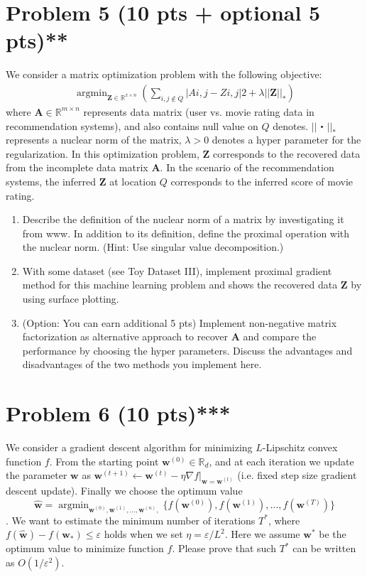 \documentclass{jsarticle}
\DeclareMathOperator*{\argmin}{argmin}
\begin{document}
\section*{Problem 5 (10 pts + optional 5 pts)**}
We consider a matrix optimization problem with the following objective:
\begin{align*}
  \argmin_{\bm Z\in\mathbb R^{x\times n}} \left( \sum_{i,j\notin Q} |Ai,j − Zi,j |2 + λ||\bm Z||_*\right)
\end{align*}
where $\bm A \in \mathbb R^{m\times n}$ represents data matrix (user vs. movie rating data in recommendation systems), and also contains null value on $Q$ denotes. $||・||_*$ represents a nuclear norm of the matrix, $\lambda > 0$ denotes a hyper parameter for the regularization. In this optimization problem, $\bm Z$ corresponds to the recovered data from the incomplete data matrix $\bm A$. In the scenario of the recommendation systems, the inferred $\bm Z$ at location $Q$ corresponds to the inferred score of movie rating.
\begin{enumerate}
  \item Describe the definition of the nuclear norm of a matrix by investigating it from www. In addition to its definition, define the proximal operation with the nuclear norm. (Hint: Use singular value decomposition.)
  \item With some dataset (see Toy Dataset III), implement proximal gradient method for this machine learning problem and shows the recovered data $\bm Z$ by using surface plotting.
  \item (Option: You can earn additional 5 pts) Implement non-negative matrix factorization as alternative approach to recover $\bm A$ and compare the performance by choosing the hyper parameters. Discuss the advantages and disadvantages of the two methods you implement here.
\end{enumerate}

\section*{Problem 6 (10 pts)***}
We consider a gradient descent algorithm for minimizing $L$-Lipschitz convex function $f$. From the starting point $\bm w^{(0)} \in \mathbb R_d$, and at each iteration we update the parameter $\bm w$ as $\bm w^{(t+1)} \leftarrow \bm w^{(t)} − \eta \nabla f|_{\bm w=\bm w^{(t)}}$ (i.e. fixed step size gradient descent update). Finally we choose the optimum value
$$
\hat{\bm w} = \argmin_{\bm w^{(0)},\bm w^{(1)},\ldots,\bm w^{(n)},} \{f(\bm w^{(0)}),f(\bm w^{(1)}),\ldots,f(\bm w^{(T)})\}
$$
. We want to estimate the minimum number of iterations $T^*$, where $f(\hat{\bm w})−f(\bm w_*) \le \varepsilon$ holds when we set $\eta=\varepsilon/L^2$. Here we assume $\bm w^*$ be the optimum value to minimize function $f$. Please prove that such $T^*$ can be written as $O(1/\varepsilon^2)$.
\end{document}
